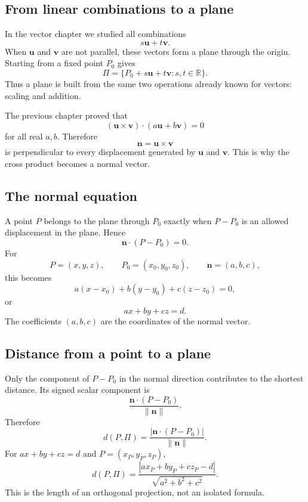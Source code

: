 \subsection{From linear combinations to a plane}

In the vector chapter we studied all combinations
\[
s\mathbf u+t\mathbf v.
\]
When $\mathbf u$ and $\mathbf v$ are not parallel, these vectors form a
plane through the origin. Starting from a fixed point $P_0$ gives
\[
\Pi=\{P_0+s\mathbf u+t\mathbf v:s,t\in\mathbb R\}.
\]
Thus a plane is built from the same two operations already known for vectors:
scaling and addition.

The previous chapter proved that
\[
(\mathbf u\times\mathbf v)\cdot(a\mathbf u+b\mathbf v)=0
\]
for all real $a,b$. Therefore
\[
\mathbf n=\mathbf u\times\mathbf v
\]
is perpendicular to every displacement generated by $\mathbf u$ and
$\mathbf v$. This is why the cross product becomes a normal vector.

\subsection{The normal equation}

A point $P$ belongs to the plane through $P_0$ exactly when $P-P_0$ is an
allowed displacement in the plane. Hence
\[
\boxed{\mathbf n\cdot(P-P_0)=0.}
\]
For
\[
P=(x,y,z),\qquad P_0=(x_0,y_0,z_0),\qquad \mathbf n=(a,b,c),
\]
this becomes
\[
a(x-x_0)+b(y-y_0)+c(z-z_0)=0,
\]
or
\[
ax+by+cz=d.
\]
The coefficients $(a,b,c)$ are the coordinates of the normal vector.

\begin{center}
\end{center}

\subsection{Distance from a point to a plane}

Only the component of $P-P_0$ in the normal direction contributes to the
shortest distance. Its signed scalar component is
\[
\frac{\mathbf n\cdot(P-P_0)}{\|\mathbf n\|}.
\]
Therefore
\[
\boxed{
d(P,\Pi)=\frac{|\mathbf n\cdot(P-P_0)|}{\|\mathbf n\|}.
}
\]
For $ax+by+cz=d$ and $P=(x_P,y_P,z_P)$,
\[
\boxed{
d(P,\Pi)=
\frac{|ax_P+by_P+cz_P-d|}{\sqrt{a^2+b^2+c^2}}.
}
\]
This is the length of an orthogonal projection, not an isolated formula.
